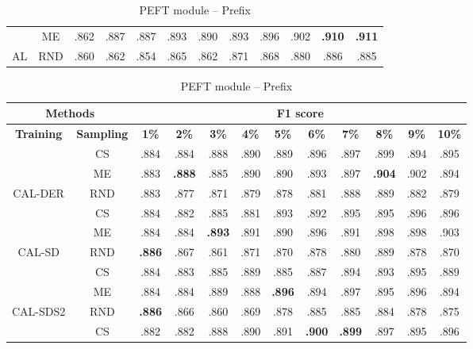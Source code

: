 \begin{table}[htbp]
\begin{subtable}{\linewidth}
\begin{tabular}{c|c|cccccccccc}
 & ME & .862 & .887 & .887 & .893 & .890 & .893 & .896 & .902 & \textbf{.910} & \textbf{.911}\\

\multirow{-3}{*}{\raggedright\arraybackslash AL} & RND & .860 & .862 & .854 & .865 & .862 & .871 & .868 & .880 & .886 & .885\\
\bottomrule
\end{tabular}
\end{subtable}
\vspace{1em}
\begin{subtable}{\linewidth}
\centering
\caption{PEFT module -- Prefix}

\begin{tabular}{c|c|cccccccccc}
\toprule
\multicolumn{2}{c|}{\textbf{Methods}} & \multicolumn{10}{c}{\textbf{F1 score}} \\
\midrule
\textbf{Training} & \textbf{Sampling} & \textbf{1\%} & \textbf{2\%} & \textbf{3\%} & \textbf{4\%} & \textbf{5\%} & \textbf{6\%} & \textbf{7\%} & \textbf{8\%} & \textbf{9\%} & \textbf{10\%}\\
\midrule
 & CS & .884 & .884 & .888 & .890 & .889 & .896 & .897 & .899 & .894 & .895\\

 & ME & .883 & \textbf{.888} & .885 & .890 & .890 & .893 & .897 & \textbf{.904} & .902 & .894\\

\multirow{-3}{*}{\raggedright\arraybackslash CAL-DER} & RND & .883 & .877 & .871 & .879 & .878 & .881 & .888 & .889 & .882 & .879\\
\midrule
 & CS & .884 & .882 & .885 & .881 & .893 & .892 & .895 & .895 & .896 & .896\\

 & ME & .884 & .884 & \textbf{.893} & .891 & .890 & .896 & .891 & .898 & .898 & .903\\

\multirow{-3}{*}{\raggedright\arraybackslash CAL-SD} & RND & \textbf{.886} & .867 & .861 & .871 & .870 & .878 & .880 & .889 & .878 & .870\\
\midrule
 & CS & .884 & .883 & .885 & .889 & .885 & .887 & .894 & .893 & .895 & .889\\

 & ME & .884 & .884 & .889 & .888 & \textbf{.896} & .894 & .897 & .895 & .896 & .894\\

\multirow{-3}{*}{\raggedright\arraybackslash CAL-SDS2} & RND & \textbf{.886} & .866 & .860 & .869 & .878 & .885 & .885 & .884 & .878 & .875\\
\midrule
 & CS & .882 & .882 & .888 & .890 & .891 & \textbf{.900} & \textbf{.899} & .897 & .895 & .896\\


\end{tabular}
\end{subtable}
\end{table}
